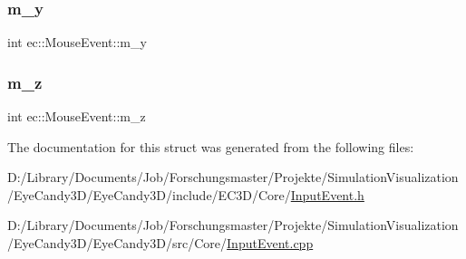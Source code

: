 \mbox{\label{structec_1_1_mouse_event_a70f1a81a4a1099cb425a4461d23dfbba}} 
\subsubsection{\texorpdfstring{m\+\_\+y}{m\_y}}
{\footnotesize\ttfamily int ec\+::\+Mouse\+Event\+::m\+\_\+y}

\mbox{\label{structec_1_1_mouse_event_a6ba4ec5d26b3dbe8be4d57b4197bada2}} 
\subsubsection{\texorpdfstring{m\+\_\+z}{m\_z}}
{\footnotesize\ttfamily int ec\+::\+Mouse\+Event\+::m\+\_\+z}



The documentation for this struct was generated from the following files\+:\begin{DoxyCompactItemize}
\item 
D\+:/\+Library/\+Documents/\+Job/\+Forschungsmaster/\+Projekte/\+Simulation\+Visualization/\+Eye\+Candy3\+D/\+Eye\+Candy3\+D/include/\+E\+C3\+D/\+Core/\mbox{\hyperlink{_input_event_8h}{Input\+Event.\+h}}\item 
D\+:/\+Library/\+Documents/\+Job/\+Forschungsmaster/\+Projekte/\+Simulation\+Visualization/\+Eye\+Candy3\+D/\+Eye\+Candy3\+D/src/\+Core/\mbox{\hyperlink{_input_event_8cpp}{Input\+Event.\+cpp}}\end{DoxyCompactItemize}
